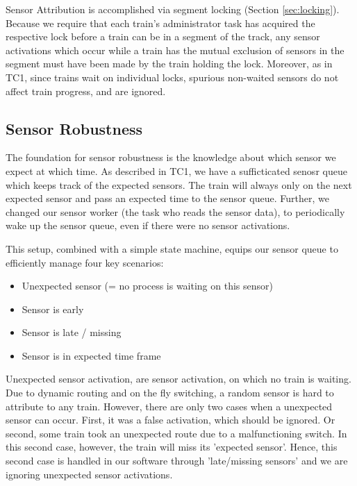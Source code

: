 \documentclass[12pt, titlepage]{article}
\begin{document}
    Sensor Attribution is accomplished via segment locking (Section \ref{sec:locking}). Because we require that each train's administrator task has acquired the respective lock before a train can be in a segment of the track, any sensor activations which occur while a train has the mutual exclusion of sensors in the segment must have been made by the train holding the lock. Moreover, as in TC1, since trains wait on individual locks, spurious non-waited sensors do not affect train progress, and are ignored.
    
    
    \subsection{Sensor Robustness}
    \label{sec:sensor-robustness}
    The foundation for sensor robustness is the knowledge about which sensor we expect at which time. 
    As described in TC1, we have a sufficticated senosr queue which keeps track of the expected sensors.    
    The train will always only on the next expected sensor and pass an expected time to the sensor queue. 
    Further, we changed our sensor worker (the task who reads the sensor data), to periodically wake up the sensor queue, even if there were no sensor activations. 


    This setup, combined with a simple state machine, equips our sensor queue to efficiently manage four key scenarios:
    \begin{itemize}
        \item Unexpected sensor (= no process is waiting on this sensor)
        \item Sensor is early
        \item Sensor is late / missing
        \item Sensor is in expected time frame
    \end{itemize}
    Unexpected sensor activation, are sensor activation, on which no train is waiting. 
    Due to dynamic routing and on the fly switching, a random sensor is hard to attribute to any train. 
    However, there are only two cases when a unexpected sensor can occur. 
    First, it was a false activation, which should be ignored. 
    Or second, some train took an unexpected route due to a malfunctioning switch. In this second case, however, the train will miss its 'expected sensor'. 
    Hence, this second case is handled in our software through 'late/missing sensors' and we are ignoring unexpected sensor activations.
\end{document}
